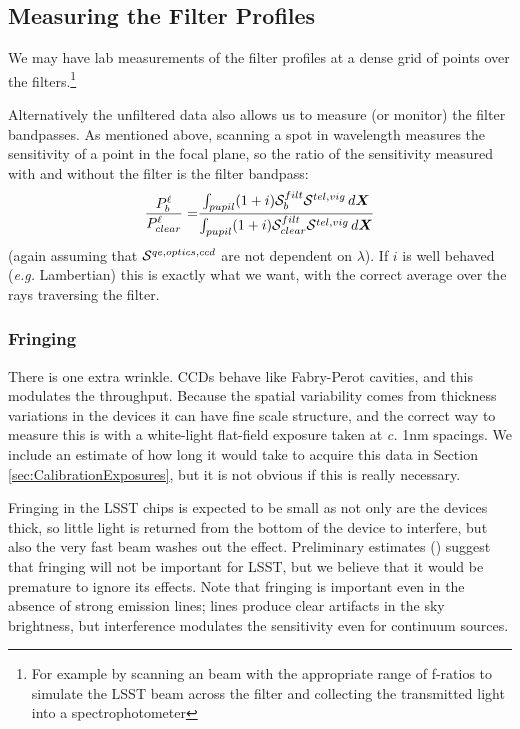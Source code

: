 \documentclass[12pt]{article}
\renewcommand{\c}{\textit{c.}\xspace}
\newcommand{\eg}{\textit{e.g.}\xspace}
\newcommand{\Xb}{{\boldsymbol X}}
\newcommand{\qe}{{\cal S}}
\begin{document}
\subsection{Measuring the Filter Profiles}
\label{secFilterProfiles}

We may have lab measurements of the filter profiles at a dense grid of points over the filters.\footnote{
  For example by scanning an beam with the appropriate range of f-ratios to simulate the LSST beam
  across the filter and collecting the transmitted light into a spectrophotometer}

Alternatively the unfiltered data also allows us to measure (or monitor) the filter bandpasses.  As mentioned
above, scanning a spot in wavelength measures the sensitivity of a point in the focal plane, so the ratio of
the sensitivity measured with and without the filter is the filter bandpass:
\begin{align*}
  \frac{P_b^\ell}{P_{clear}^\ell} =& \frac{\int_{pupil} (1 + i) \qe_b^{filt} \qe^{tel, vig}\, d\Xb}
                                          {\int_{pupil} (1 + i) \qe_{clear}^{filt} \qe^{tel, vig}\, d\Xb}\\
\end{align*}
(again assuming that $\qe^{qe, optics, ccd}$ are not dependent on $\lambda$).  If $i$ is well behaved (\eg
Lambertian) this is exactly what we want, with the correct average over the rays traversing the filter.

\subsubsection{Fringing}

There is one extra wrinkle.  CCDs behave like Fabry-Perot cavities, and this modulates the throughput. Because
the spatial variability comes from thickness variations in the devices it can have fine scale structure, and
the correct way to measure this is with a white-light flat-field exposure taken at \c 1nm spacings.  We
include an estimate of how long it would take to acquire this data in Section \ref{sec:CalibrationExposures},
but it is not obvious if this is really necessary.

Fringing in the LSST chips is expected to be small as not only are the devices thick, so little light is
returned from the bottom of the device to interfere, but also the very fast beam washes out the
effect. Preliminary estimates (\cite{document-8590}) suggest that fringing will not be important for
LSST, but we believe that it would be premature to ignore its effects.  Note that fringing is important
even in the absence of strong emission lines;  lines produce clear artifacts in the sky brightness, but
interference modulates the sensitivity even for continuum sources.
\end{document}

